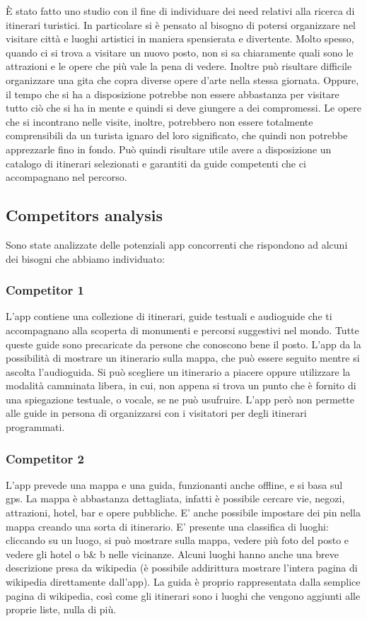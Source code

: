 

È stato fatto uno studio con il fine di individuare dei need relativi alla ricerca
di itinerari turistici. In particolare si è pensato al bisogno di potersi organizzare nel visitare città e
luoghi artistici in maniera spensierata e divertente. Molto spesso, quando ci si trova a 
visitare un nuovo posto, non si sa chiaramente quali sono le attrazioni e le opere che più
vale la pena di vedere. Inoltre può risultare difficile organizzare una gita che copra
diverse opere d'arte nella stessa giornata. Oppure, il tempo che si ha a disposizione potrebbe non
essere abbastanza per visitare tutto ciò che si ha in mente e quindi si deve giungere a dei compromessi.
Le opere che si incontrano nelle visite, inoltre, potrebbero non essere totalmente comprensibili
da un turista ignaro del loro significato, che quindi non potrebbe apprezzarle fino in fondo.
Può quindi risultare utile avere a disposizione un catalogo di itinerari selezionati e
garantiti da guide competenti che ci accompagnano nel percorso.

\subsection*{Competitors analysis}

Sono state analizzate delle potenziali app concorrenti che rispondono ad alcuni dei bisogni
che abbiamo individuato:

\subsubsection*{Competitor 1}
L'app contiene una collezione di itinerari, guide testuali e audioguide che ti accompagnano
alla scoperta di monumenti e percorsi suggestivi nel mondo.
Tutte queste guide sono precaricate da persone che conoscono bene il posto.
L’app da la possibilità di mostrare un itinerario sulla mappa, che può essere seguito
mentre si ascolta l’audioguida.
Si può scegliere un itinerario a piacere oppure utilizzare la modalità camminata libera,
in cui, non appena si trova un punto che è fornito di una spiegazione testuale, o vocale,
se ne può usufruire.
L’app però non permette alle guide in persona di organizzarsi con i visitatori per degli
itinerari programmati.

\subsubsection*{Competitor 2}
L'app prevede una mappa e una guida, funzionanti anche offline, e si basa sul gps.
La mappa è abbastanza dettagliata, infatti è possibile cercare vie,
negozi, attrazioni, hotel, bar e opere pubbliche.
E’ anche possibile impostare dei pin nella mappa creando una sorta di itinerario.
E’ presente una classifica di luoghi: cliccando su un luogo, si può mostrare sulla mappa,
vedere più foto del posto e vedere gli hotel o b\& b nelle vicinanze.
Alcuni luoghi hanno anche una breve descrizione presa da wikipedia
(è possibile addirittura mostrare l’intera pagina di wikipedia direttamente dall’app).
La guida è proprio rappresentata dalla semplice pagina di wikipedia, 
così come gli itinerari sono i luoghi che vengono aggiunti alle proprie liste, nulla di più.
